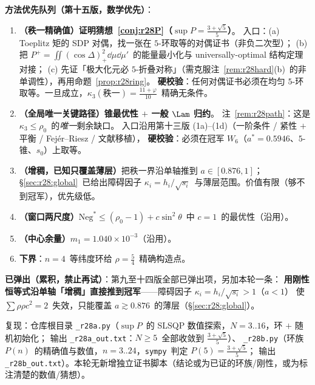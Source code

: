 \textbf{方法优先队列（第十五版，数学优先）}：
\begin{enumerate}\itemsep=2pt
\item[\textbf{P1$'$}]\textbf{（秩一精确值）证明猜想~\ref{conj:r28P}（$\sup P=\frac{3+\sqrt5}5$）}。
入口：(a) Toeplitz 矩的 SDP 对偶，找一张在 $5$-环取等的对偶证书（非负二次型）；
(b) 把 $P^+=\iint(\cos\Delta)_+^2\dd\mu\dd\mu'$~的能量最小化与 universally-optimal 结构定理对接；
(c) 先证「极大化元必 $5$-折叠对称」（需克服注~\ref{rem:r28hard}(b)~的非单调性），再用命题~\ref{prop:r28ring}。
\textbf{硬校验}：任何对偶证书必须在均匀 $5$-环取等。一旦成立，$\kappa_3(\text{秩一})=\frac{11+\varphi}{10}$~精确无条件。
\item[\textbf{P1}]\textbf{（全局唯一关键路径）锥最优性 $+$ 一般 $\Lam$ 归约}。
注~\ref{rem:r28path}：这是 $\kappa_3\le\rho_0$~的\emph{唯一}剩余缺口。
入口沿用第十三版 (1a)--(1d)（一阶条件 / 紧性 $+$ 平衡 / Fej\'er--Riesz / 文献移植），
\textbf{硬校验}：必须在冠军 $W_6$（$a^*=0.5946$、$5$-锥、$s_0$）上取等。
\item[\textbf{P2}]\textbf{（增稠，已知只覆盖薄层）}把秩一界沿单轴推到 $a\in[0.876,1]$；
\S\ref{sec:r28:global}~已给出障碍因子 $\kappa_i=h_i/\sqrt{s_i}$~与薄层范围。价值有限（够不到冠军），优先级低。
\item[\textbf{P3}]\textbf{（窗口两尺度）}$\mathrm{Neg}^*\le(\rho_0-1)+c\sin^2\theta$~中 $c=1$~的最优性（沿用）。
\item[\textbf{P4}]\textbf{（中心余量）}$m_1=1.040\times10^{-3}$（沿用）。
\item[\textbf{副}]\textbf{下界}：$n=4$~等纬度环给 $\rho=\frac54$~精确构造点。
\end{enumerate}

\textbf{已弹出（累积，禁止再试）}：第九至十四版全部已弹出项，另加本轮一条：
\textbf{用刚性恒等式沿单轴「增稠」直接推到冠军}——障碍因子 $\kappa_i=h_i/\sqrt{s_i}>1$（$a<1$）
使 $\sum\rho\rho c^2=2$~失效，只能覆盖 $a\gtrsim0.876$~的薄层（\S\ref{sec:r28:global}）。

复现：仓库根目录 \texttt{\_r28a.py}（$\sup P$~的 SLSQP 数值探索，$N=3..16$，环 $+$ 随机初始化；
输出 \texttt{\_r28a\_out.txt}：$N\ge5$~全部收敛到 $\frac{3+\sqrt5}5$）、
\texttt{\_r28b.py}（环族 $P(n)$~的精确值与数值，$n=3..24$，\texttt{sympy}~判定 $P(5)=\frac{3+\sqrt5}5$；
输出 \texttt{\_r28b\_out.txt}）。本轮无新增独立证书脚本（结论或为已证的环族/刚性，或为标注清楚的数值/猜想）。

